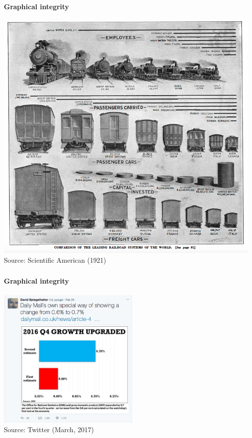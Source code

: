 \documentclass[8pt]{beamer}
\begin{document}

\begin{frame}
\frametitle{\insertsection}
\framesubtitle{Graphical integrity}

\centering
\includegraphics[height = 0.8\textheight]{SA_1921.png}\\
\tiny{Source: Scientific American (1921)}

\end{frame}


\begin{frame}
\frametitle{\insertsection}
\framesubtitle{Graphical integrity}

\centering
\includegraphics[width=7cm]{integrity}\\
\tiny{Source: Twitter (March, 2017)}

\end{frame}
\end{document}
